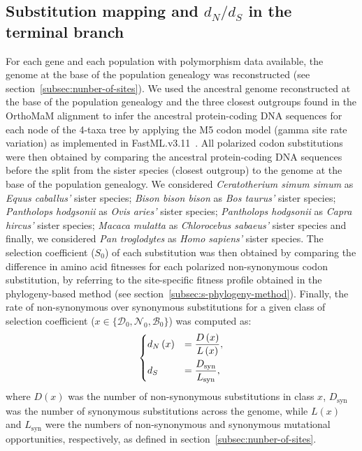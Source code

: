 \documentclass{article}
\newcommand{\dn}{d_N}
\newcommand{\ds}{d_S}
\newcommand{\dnds}{\dn / \ds}
\newcommand{\Sphy}{S_{0}}
\newcommand{\SphyDel}{\mathcal{D}_0}
\newcommand{\SphyNeu}{\mathcal{N}_0}
\newcommand{\SphyBen}{\mathcal{B}_0}
\newcommand{\Sphyclass}{x}
\begin{document}
    \subsection{Substitution mapping and $\dnds$ in the terminal branch}
    \label{subsec:substitution-mapping-in-the-terminal-branch}
    For each gene and each population with polymorphism data available, the genome at the base of the population genealogy was reconstructed (see section~\ref{subsec:nunber-of-sites}).
    We used the ancestral genome reconstructed at the base of the population genealogy and the three closest outgroups found in the OrthoMaM alignment to infer the ancestral protein-coding DNA sequences for each node of the 4-taxa tree by applying the M5 codon model (gamma site rate variation) as implemented in FastML.v3.11~\cite{ashkenazy_fastml_2012}.
    All polarized codon substitutions were then obtained by comparing the ancestral protein-coding DNA sequences before the split from the sister species (closest outgroup) to the genome at the base of the population genealogy.
    We considered \textit{Ceratotherium simum simum} as \textit{Equus caballus'} sister species; \textit{Bison bison bison} as \textit{Bos taurus'} sister species; \textit{Pantholops hodgsonii} as \textit{Ovis aries'} sister species; \textit{Pantholops hodgsonii} as \textit{Capra hircus'} sister species; \textit{Macaca mulatta} as \textit{Chlorocebus sabaeus'} sister species and finally, we considered \textit{Pan troglodytes} as \textit{Homo sapiens'} sister species.
    The selection coefficient ($\Sphy$) of each substitution was then obtained by comparing the difference in amino acid fitnesses for each polarized non-synonymous codon substitution, by referring to the site-specific fitness profile obtained in the phylogeny-based method (see section~\ref{subsec:s-phylogeny-method}).
    Finally, the rate of non-synonymous over synonymous substitutions for a given class of selection coefficient ($\Sphyclass \in \{\SphyDel, \SphyNeu, \SphyBen \}$) was computed as:
    \begin{align}
        \begin{dcases}
            \dn \left( \Sphyclass \right) &= \dfrac{D\left( \Sphyclass \right)}{L \left( \Sphyclass \right)}, \\
            \ds &= \dfrac{D_{\text{syn}}}{L_{\text{syn}}},
        \end{dcases}\label{eq:dnds}
    \end{align}
    where $D \left( \Sphyclass \right) $ was the number of non-synonymous substitutions in class $\Sphyclass$, $D_{\text{syn}}$ was the number of synonymous substitutions across the genome, while $L \left( \Sphyclass \right)$ and $L_{\text{syn}}$ were the numbers of non-synonymous and synonymous mutational opportunities, respectively, as defined in section~\ref{subsec:nunber-of-sites}.
\end{document}
